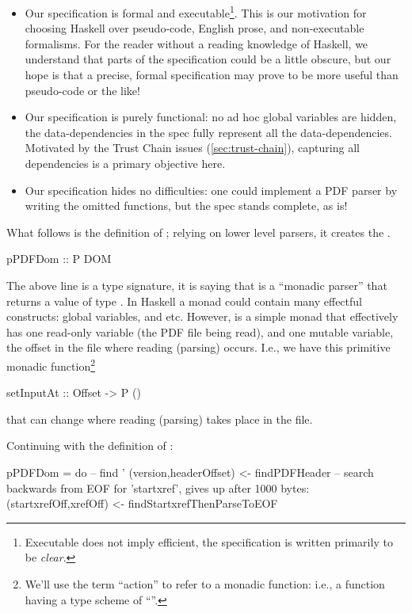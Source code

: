 \begin{itemize}
\item Our specification is formal and executable\footnote{
  Executable does not imply efficient, the specification is written
  primarily to be \emph{clear}.}.
  This is our motivation for choosing Haskell over pseudo-code, English prose,
  and non-executable formalisms.  For the reader without a reading knowledge of
  Haskell, we understand that parts of the specification could be a little
  obscure, but our hope is that a precise, formal specification may prove to be
  more useful than pseudo-code or the like!
  
\item Our specification is purely functional: no ad hoc global variables are
  hidden, the data-dependencies in the spec fully represent all the
  data-dependencies.  Motivated by the Trust Chain issues
  (\cref{sec:trust-chain}), capturing all dependencies is a primary objective
  here.
  
\item Our specification hides no difficulties: one could implement a PDF parser
  by writing the omitted functions, but the spec stands complete, as is!
\end{itemize}


What follows is the definition of ; relying on lower level
parsers, it creates the .
\begin{code}
pPDFDom :: P DOM
\end{code}
The above line is a type signature, it is saying that
 is a ``monadic parser''  that returns a
value of type .
In Haskell a monad could contain many effectful constructs: global variables,
and etc. However,  is a simple monad that effectively has one
read-only variable (the PDF file being read), and one mutable variable,
the offset in the file where reading (parsing) occurs.  I.e., we have
this primitive monadic function\footnote{
  We'll use the term ``action'' to refer to a monadic function:
  i.e., a function having a type scheme of ``''.
}
\begin{codeNoExecute}
setInputAt :: Offset -> P ()
\end{codeNoExecute}
that can change where reading (parsing) takes place in the file.

Continuing with the definition of :
\begin{code}
pPDFDom =
    do
    -- find '%
    (version,headerOffset) <- findPDFHeader
    -- search backwards from EOF for 'startxref', gives up after 1000 bytes:
    (startxrefOff,xrefOff) <- findStartxrefThenParseToEOF
\end{code}

